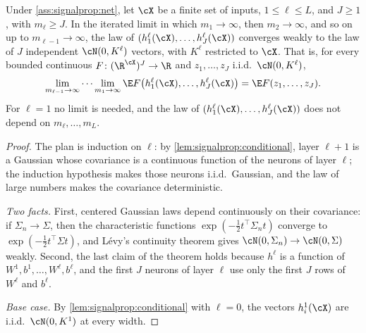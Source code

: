 \begin{refsection}
\begin{theorem}\label{thm:signalprop:gp}
Under \cref{ass:signalprop:net}, let $\cX$ be a finite set of inputs, $1\le\ell\le L$, and $J\ge1$, with $m_\ell\ge J$. In the iterated limit in which $m_1\to\infty$, then $m_2\to\infty$, and so on up to $m_{\ell-1}\to\infty$, the law of $(h^\ell_1(\cX),\dots,h^\ell_J(\cX))$ converges weakly to the law of $J$ independent $\cN(0,K^\ell)$ vectors, with $K^\ell$ restricted to $\cX$. That is, for every bounded continuous $F\colon(\R^{\cX})^J\to\R$ and $z_1,\dots,z_J$ i.i.d.\ $\cN(0,K^\ell)$,
\[
  \lim_{m_{\ell-1}\to\infty}\cdots\lim_{m_1\to\infty}\E F\bigl(h^\ell_1(\cX),\dots,h^\ell_J(\cX)\bigr)=\E F(z_1,\dots,z_J).
\]
For $\ell=1$ no limit is needed, and the law of $(h^\ell_1(\cX),\dots,h^\ell_J(\cX))$ does not depend on $m_\ell,\dots,m_L$.
\end{theorem}

\begin{proof}
The plan is induction on $\ell$: by \cref{lem:signalprop:conditional}, layer $\ell+1$ is a Gaussian whose covariance is a continuous function of the neurons of layer $\ell$; the induction hypothesis makes those neurons i.i.d.\ Gaussian, and the law of large numbers makes the covariance deterministic.

\emph{Two facts.} First, centered Gaussian laws depend continuously on their covariance: if $\Sigma_n\to\Sigma$, then the characteristic functions $\exp(-\frac12t^\top\Sigma_nt)$ converge to $\exp(-\frac12t^\top\Sigma t)$, and L\'evy's continuity theorem gives $\cN(0,\Sigma_n)\to\cN(0,\Sigma)$ weakly. Second, the last claim of the theorem holds because $h^\ell$ is a function of $W^1,b^1,\dots,W^\ell,b^\ell$, and the first $J$ neurons of layer $\ell$ use only the first $J$ rows of $W^\ell$ and $b^\ell$.

\emph{Base case.} By \cref{lem:signalprop:conditional} with $\ell=0$, the vectors $h^1_i(\cX)$ are i.i.d.\ $\cN(0,K^1)$ at every width.


\end{proof}
\end{refsection}
